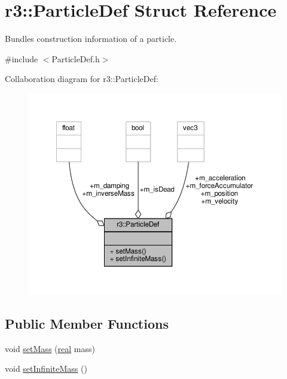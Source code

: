 \hypertarget{structr3_1_1_particle_def}{}\section{r3\+:\+:Particle\+Def Struct Reference}
\label{structr3_1_1_particle_def}


Bundles construction information of a particle.  




{\ttfamily \#include $<$Particle\+Def.\+h$>$}



Collaboration diagram for r3\+:\+:Particle\+Def\+:\nopagebreak
\begin{figure}[H]
\begin{center}
\leavevmode
\includegraphics[width=350pt]{structr3_1_1_particle_def__coll__graph}
\end{center}
\end{figure}
\subsection*{Public Member Functions}
\begin{DoxyCompactItemize}
\item 
void \mbox{\hyperlink{structr3_1_1_particle_def_a89966eea5b3ef424f105626dedb266e1}{set\+Mass}} (\mbox{\hyperlink{namespacer3_ab2016b3e3f743fb735afce242f0dc1eb}{real}} mass)
\item 
void \mbox{\hyperlink{structr3_1_1_particle_def_a779364b02815c9e4ea30678ea4031445}{set\+Infinite\+Mass}} ()
\end{DoxyCompactItemize}
